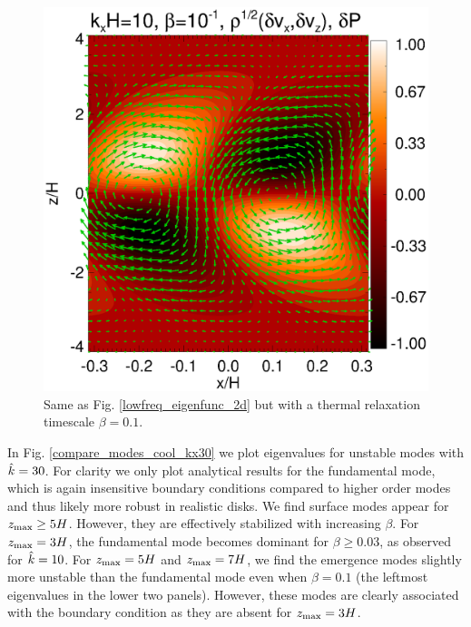 \begin{figure}
  \includegraphics[width=\linewidth]{figures/result2d_cool}
  \caption{Same as  Fig. \ref{lowfreq_eigenfunc_2d} but with a thermal
    relaxation timescale $\beta=0.1$. 
    \label{lowfreq_eigenfunc_2d_cool}
  }
\end{figure}


In Fig. \ref{compare_modes_cool_kx30} we plot eigenvalues for unstable
modes with $\hat{k}=30$. For clarity we only plot analytical results for
the fundamental mode, which is again insensitive boundary
conditions compared to higher order modes and thus likely more
robust in realistic disks. We find surface modes
appear for $z_\mathrm{max}\geq5H$. However, they are effectively stabilized with
increasing $\beta$. For $z_\mathrm{max}=3H$, the fundamental mode becomes
dominant for $\beta\geq 0.03$, as observed for $\hat{k}=10$. For
$z_\mathrm{max}=5H$ and $z_\mathrm{max}=7H$, we find the emergence modes slightly more
unstable than the fundamental mode even when $\beta=0.1$ (the leftmost
eigenvalues in the lower two panels). However, these modes are clearly associated
with the boundary condition as they are absent for $z_\mathrm{max}=3H$. 

